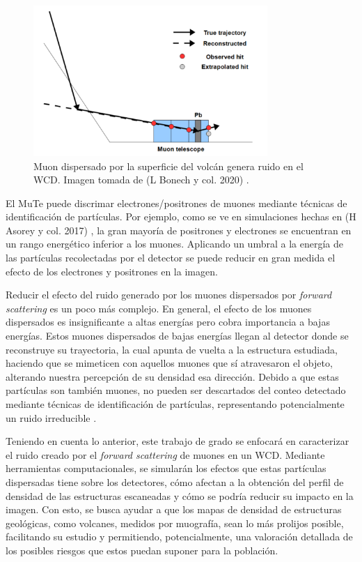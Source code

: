 \documentclass[12pt]{report}
\begin{document}
\begin{figure}
    \centering
    \includegraphics[width=3.5in]{images/scatteredNoiseV2.png}
    \caption{Muon dispersado por la superficie del volcán genera ruido en el WCD. Imagen tomada de (L Bonech y col. 2020) \cite{bonechi2020atmospheric}.}
    \label{fig:scatteredNoise}
\end{figure}

El MuTe puede discrimar electrones/positrones de muones mediante técnicas de identificación de partículas. Por ejemplo, como se ve en simulaciones hechas en (H Asorey y col. 2017) \cite{asorey2017muon}, la gran mayoría de positrones y electrones se encuentran en un rango energético inferior a los muones. Aplicando un umbral a la energía de las partículas recolectadas por el detector se puede reducir en gran medida el efecto de los electrones y positrones en la imagen.

Reducir el efecto del ruido generado por los muones dispersados por \textit{forward scattering} es un poco más complejo. En general, el efecto de los muones dispersados es insignificante a altas energías pero cobra importancia a bajas energías. Estos muones dispersados de bajas energías llegan al detector donde se reconstruye su trayectoria, la cual apunta de vuelta a la estructura estudiada, haciendo que se mimeticen con aquellos muones que sí atravesaron el objeto, alterando nuestra percepción de su densidad esa dirección. Debido a que estas partículas son también muones, no pueden ser descartados del conteo detectado mediante técnicas de identificación de partículas, representando potencialmente un ruido irreducible \cite{gomez2017forward}.

Teniendo en cuenta lo anterior, este trabajo de grado se enfocará en caracterizar el ruido creado por el \textit{forward scattering} de muones en un WCD. Mediante herramientas computacionales, se simularán los efectos que estas partículas dispersadas tiene sobre los detectores, cómo afectan a la obtención del perfil de densidad de las estructuras escaneadas y cómo se podría reducir su impacto en la imagen. Con esto, se busca ayudar a que los mapas de densidad de estructuras geológicas, como volcanes, medidos por muografía, sean lo más prolijos posible, facilitando su estudio y permitiendo, potencialmente, una valoración detallada de los posibles riesgos que estos puedan suponer para la población.
\end{document}
